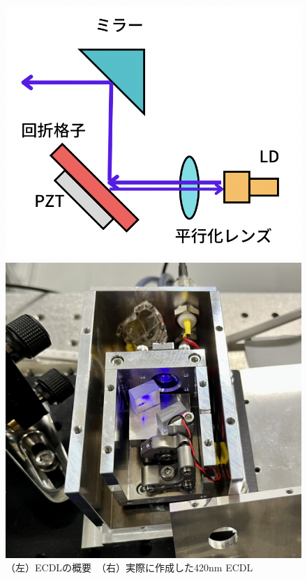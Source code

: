 \documentclass[dvipdfmx]{jsarticle}
\begin{document}
\begin{figure}[hbtp]
\centering
\begin{minipage}[b]{0.4\linewidth}
\includegraphics[width=1\textwidth]{images/ecdl.png}
\end{minipage}
\begin{minipage}[b]{0.45\linewidth}
\includegraphics[width=1\textwidth]{images/ecdl_real.jpg}
\end{minipage}
\caption{\label{fig:ecdl}（左）ECDLの概要　（右）実際に作成した420nm ECDL}
\end{figure}
\end{document}
